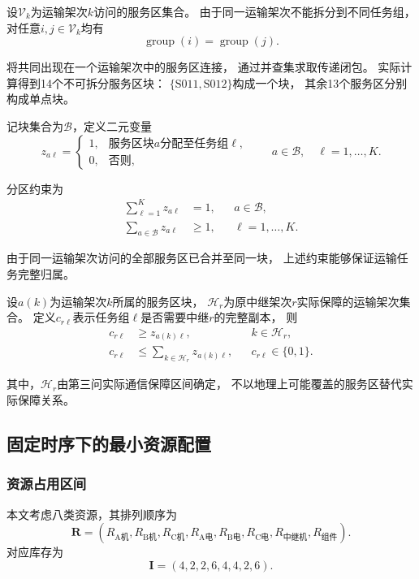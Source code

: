 \documentclass[bwprint]{gmcmthesis}
\begin{document}
设$\mathcal{V}_k$为运输架次$k$访问的服务区集合。
由于同一运输架次不能拆分到不同任务组，
对任意$i,j\in\mathcal{V}_k$均有
\begin{equation}
\operatorname{group}(i)=\operatorname{group}(j).
\end{equation}

将共同出现在一个运输架次中的服务区连接，
通过并查集求取传递闭包。
实际计算得到14个不可拆分服务区块：
$\{\mathrm{S011},\mathrm{S012}\}$构成一个块，
其余13个服务区分别构成单点块。

记块集合为$\mathcal{B}$，定义二元变量
\begin{equation}
z_{a\ell}=
\begin{cases}
1, & \text{服务区块$a$分配至任务组$\ell$},\\
0, & \text{否则},
\end{cases}
\qquad
a\in\mathcal{B},\quad \ell=1,\ldots,K.
\end{equation}

分区约束为
\begin{align}
\sum_{\ell=1}^{K}z_{a\ell}&=1,
&& a\in\mathcal{B},\\
\sum_{a\in\mathcal{B}}z_{a\ell}&\geq 1,
&& \ell=1,\ldots,K.
\end{align}

由于同一运输架次访问的全部服务区已合并至同一块，
上述约束能够保证运输任务完整归属。

设$a(k)$为运输架次$k$所属的服务区块，
$\mathcal{H}_r$为原中继架次$r$实际保障的运输架次集合。
定义$c_{r\ell}$表示任务组$\ell$是否需要中继$r$的完整副本，
则
\begin{align}
c_{r\ell}&\geq z_{a(k)\ell},
&& k\in\mathcal{H}_r,\\
c_{r\ell}&\leq
\sum_{k\in\mathcal{H}_r}z_{a(k)\ell},
&& c_{r\ell}\in\{0,1\}.
\end{align}

其中，$\mathcal{H}_r$由第三问实际通信保障区间确定，
不以地理上可能覆盖的服务区替代实际保障关系。

\subsection{固定时序下的最小资源配置}

\subsubsection{资源占用区间}

本文考虑八类资源，其排列顺序为
\begin{equation}
\boldsymbol{R}=
\left(
R_{\mathrm{A机}},R_{\mathrm{B机}},R_{\mathrm{C机}},
R_{\mathrm{A电}},R_{\mathrm{B电}},R_{\mathrm{C电}},
R_{\mathrm{中继机}},R_{\mathrm{组件}}
\right).
\end{equation}
对应库存为
\begin{equation}
\boldsymbol{I}=(4,2,2,6,4,4,2,6).
\end{equation}
\end{document}
